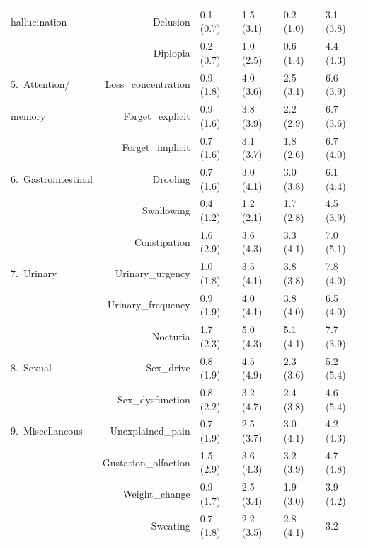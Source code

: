 \documentclass[preprint,5p]{elsarticle} %
\begin{document}
\begin{table}[t]
\begin{threeparttable}
\begin{tabular}{lrllll}
  hallucination &Delusion & 0.1 (0.7)\tnote{24} & 1.5 (3.1)\tnote{124} & 0.2 (1.0)\tnote{24} &
  3.1 (3.8)\tnote{123} \\
  &Diplopia & 0.2 (0.7)\tnote{234} & 1.0 (2.5)\tnote{14} & 0.6 (1.4)\tnote{14} & 4.4
  (4.3)\tnote{123} \\
  \midrule
  5.\ Attention/ & Loss\_concentration & 0.9 (1.8)\tnote{234} & 4.0 (3.6)\tnote{134} & 2.5 (3.1)\tnote{124} & 6.6 (3.9)\tnote{123} \\
  memory &Forget\_explicit & 0.9 (1.6)\tnote{234} & 3.8 (3.9)\tnote{134} & 2.2 (2.9)\tnote{124} & 6.7 (3.6)\tnote{123} \\
  &Forget\_implicit & 0.7 (1.6)\tnote{234} & 3.1 (3.7)\tnote{134} & 1.8 (2.6)\tnote{124} & 6.7 (4.0)\tnote{123} \\
  \midrule
  6.\ Gastrointestinal &
  Drooling & 0.7 (1.6)\tnote{234} & 3.0 (4.1)\tnote{14} & 3.0 (3.8)\tnote{14} & 6.1 (4.4)\tnote{123} \\
  &Swallowing & 0.4 (1.2)\tnote{234} & 1.2 (2.1)\tnote{14} & 1.7 (2.8)\tnote{14} & 4.5 (3.9)\tnote{123} \\
  &Constipation & 1.6 (2.9)\tnote{234} & 3.6 (4.3)\tnote{14} & 3.3 (4.1)\tnote{14} & 7.0 (5.1)\tnote{123} \\
  \midrule
  7.\ Urinary &
  Urinary\_urgency & 1.0 (1.8)\tnote{234} & 3.5 (4.1)\tnote{14} & 3.8 (3.8)\tnote{14} & 7.8 (4.0)\tnote{123} \\
  &Urinary\_frequency & 0.9 (1.9)\tnote{234} & 4.0 (4.1)\tnote{14} & 3.8 (4.0)\tnote{14} & 6.5 (4.0)\tnote{123} \\
  &Nocturia & 1.7 (2.3)\tnote{234} & 5.0 (4.3)\tnote{14} & 5.1 (4.1)\tnote{14} & 7.7 (3.9)\tnote{123} \\
  \midrule
  8.\ Sexual &
  Sex\_drive & 0.8 (1.9)\tnote{234} & 4.5 (4.9)\tnote{13} & 2.3 (3.6)\tnote{124} & 5.2 (5.4)\tnote{13} \\
  &Sex\_dysfunction & 0.8 (2.2)\tnote{234} & 3.2 (4.7)\tnote{1} & 2.4 (3.8)\tnote{14} &
  4.6 (5.4)\tnote{13} \\
  \midrule
  9.\ Miscellaneous &
  Unexplained\_pain & 0.7 (1.9)\tnote{234} & 2.5 (3.7)\tnote{14} & 3.0 (4.1)\tnote{14} & 4.2 (4.3)\tnote{123} \\
  &Gustation\_olfaction & 1.5 (2.9)\tnote{234} & 3.6 (4.3)\tnote{1} & 3.2 (3.9)\tnote{14} &
  4.7 (4.8)\tnote{13} \\
  &Weight\_change & 0.9 (1.7)\tnote{234} & 2.5 (3.4)\tnote{14} & 1.9 (3.0)\tnote{14} & 3.9 (4.2)\tnote{123} \\
  &Sweating & 0.7 (1.8)\tnote{234} & 2.2 (3.5)\tnote{1} & 2.8 (4.1)\tnote{1} & 3.2

\end{tabular}
\end{threeparttable}
\end{table}
\end{document}
